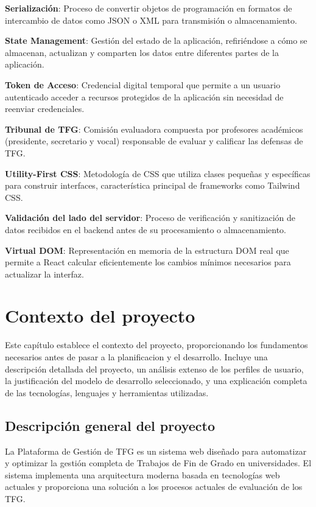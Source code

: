 \documentclass[12pt,a4paper,oneside]{report}
\begin{document}
\textbf{Serialización}: Proceso de convertir objetos de programación en
formatos de intercambio de datos como JSON o XML para transmisión o
almacenamiento.

\textbf{State Management}: Gestión del estado de la aplicación,
refiriéndose a cómo se almacenan, actualizan y comparten los datos entre
diferentes partes de la aplicación.

\textbf{Token de Acceso}: Credencial digital temporal que permite a un
usuario autenticado acceder a recursos protegidos de la aplicación sin
necesidad de reenviar credenciales.

\textbf{Tribunal de TFG}: Comisión evaluadora compuesta por profesores
académicos (presidente, secretario y vocal) responsable de evaluar y
calificar las defensas de TFG.

\textbf{Utility-First CSS}: Metodología de CSS que utiliza clases
pequeñas y específicas para construir interfaces, característica
principal de frameworks como Tailwind CSS.

\textbf{Validación del lado del servidor}: Proceso de verificación y
sanitización de datos recibidos en el backend antes de su procesamiento
o almacenamiento.

\textbf{Virtual DOM}: Representación en memoria de la estructura DOM
real que permite a React calcular eficientemente los cambios mínimos
necesarios para actualizar la interfaz.

\chapter{Contexto del proyecto}\label{contexto-del-proyecto}

Este capítulo establece el contexto del proyecto, proporcionando los fundamentos necesarios antes de pasar a la planificacion y el desarrollo. Incluye una descripción detallada del proyecto, un análisis extenso de los perfiles de usuario, la justificación del modelo de desarrollo seleccionado, y una explicación completa de las tecnologías, lenguajes y herramientas utilizadas.

\section{Descripción general del
proyecto}\label{descripciuxf3n-general-del-proyecto}

La Plataforma de Gestión de TFG es un sistema web diseñado para automatizar y optimizar la gestión completa de Trabajos de Fin de Grado en universidades. El sistema implementa una arquitectura moderna basada en tecnologías web actuales y proporciona una solución a los procesos actuales de evaluación de los TFG.
\end{document}
